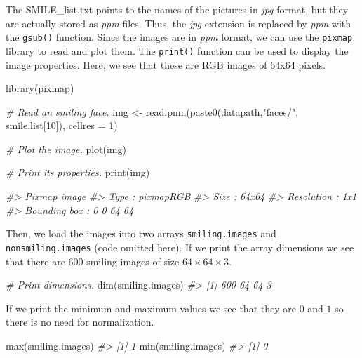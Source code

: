 \documentclass[
  11pt,
]{krantz}
\newenvironment{Shaded}{\begin{snugshade}}{\end{snugshade}}
\newcommand{\AttributeTok}[1]{\textcolor[rgb]{0.61,0.61,0.61}{#1}}
\newcommand{\CommentTok}[1]{\textcolor[rgb]{0.37,0.37,0.37}{\textit{#1}}}
\newcommand{\DecValTok}[1]{\textcolor[rgb]{0.06,0.06,0.06}{#1}}
\newcommand{\FunctionTok}[1]{\textcolor[rgb]{0,0,0}{#1}}
\newcommand{\NormalTok}[1]{#1}
\newcommand{\OtherTok}[1]{\textcolor[rgb]{0.37,0.37,0.37}{#1}}
\newcommand{\StringTok}[1]{\textcolor[rgb]{0.5,0.5,0.5}{#1}}
\begin{document}
The SMILE\_list.txt points to the names of the pictures in \emph{jpg} format, but they are actually stored as \emph{ppm} files. Thus, the \emph{jpg} extension is replaced by \emph{ppm} with the \texttt{gsub()} function. Since the images are in \emph{ppm} format, we can use the \texttt{pixmap} library \citep{pixmap} to read and plot them. The \texttt{print()} function can be used to display the image properties. Here, we see that these are RGB images of \(64\)x\(64\) pixels.

\begin{Shaded}
\begin{Highlighting}[]
\FunctionTok{library}\NormalTok{(pixmap)}

\CommentTok{\# Read an smiling face.}
\NormalTok{img }\OtherTok{\textless{}{-}} \FunctionTok{read.pnm}\NormalTok{(}\FunctionTok{paste0}\NormalTok{(datapath,}\StringTok{"faces/"}\NormalTok{, smile.list[}\DecValTok{10}\NormalTok{]), }\AttributeTok{cellres =} \DecValTok{1}\NormalTok{)}

\CommentTok{\# Plot the image.}
\FunctionTok{plot}\NormalTok{(img)}

\CommentTok{\# Print its properties.}
\FunctionTok{print}\NormalTok{(img)}

\CommentTok{\#\textgreater{} Pixmap image}
\CommentTok{\#\textgreater{} Type          : pixmapRGB }
\CommentTok{\#\textgreater{} Size          : 64x64 }
\CommentTok{\#\textgreater{} Resolution    : 1x1 }
\CommentTok{\#\textgreater{} Bounding box  : 0 0 64 64 }
\end{Highlighting}
\end{Shaded}

Then, we load the images into two arrays \texttt{smiling.images} and \texttt{nonsmiling.images} (code omitted here). If we print the array dimensions we see that there are \(600\) smiling images of size \(64 \times 64 \times 3\).

\begin{Shaded}
\begin{Highlighting}[]
\CommentTok{\# Print dimensions.}
\FunctionTok{dim}\NormalTok{(smiling.images)}
\CommentTok{\#\textgreater{} [1] 600  64  64   3}
\end{Highlighting}
\end{Shaded}

If we print the minimum and maximum values we see that they are \(0\) and \(1\) so there is no need for normalization.

\begin{Shaded}
\begin{Highlighting}[]
\FunctionTok{max}\NormalTok{(smiling.images)}
\CommentTok{\#\textgreater{} [1] 1}
\FunctionTok{min}\NormalTok{(smiling.images)}
\CommentTok{\#\textgreater{} [1] 0}
\end{Highlighting}
\end{Shaded}
\end{document}

